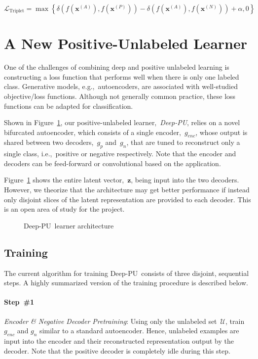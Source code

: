 \documentclass[10pt]{article}
\newcommand{\toolname}{Deep-PU}
\newcommand{\xI}[1]{\mathbf{x}^{(#1)}}
\newcommand{\puDist}[2]{\delta\left(#1, #2\right)}
\newcommand{\nnDist}[3]{\puDist{#1\left(#2\right)}{#1\left(#3\right)}}
\newcommand{\lTrip}{\mathcal{L}_{\text{Triplet}}}
\newcommand{\exA}{\xI{{A}}}
\newcommand{\exP}{\xI{{P}}}
\newcommand{\exN}{\xI{{N}}}
\begin{document}
  \begin{equation}\label{eq:TripletLoss}
    \lTrip = \max\left\{ \nnDist{f}{\exA}{\exP} - \nnDist{f}{\exA}{\exN} + \alpha, 0 \right\}
  \end{equation}

\section{A New Positive-Unlabeled Learner}\label{sec:DeepPU}

One of the challenges of combining deep and positive unlabeled learning is constructing a loss function that performs well when there is only one labeled class.  Generative models, e.g.,~autoencoders, are associated with well-studied objective/loss functions.  Although not generally common practice, these loss functions can be adapted for classification.

Shown in Figure~\ref{fig:DeepPU}, our positive-unlabeled learner,~\textit{\toolname}, relies on a novel bifurcated autoencoder, which consists of a single encoder,~$g_{enc}$, whose output is shared between two decoders,~$g_{p}$ and~$g_{n}$, that are tuned to reconstruct only a single class, i.e.,~positive or negative respectively.  Note that the encoder and decoders can be feed-forward or convolutional based on the application.

Figure~\ref{fig:DeepPU} shows the entire latent vector,~$\mathbf{z}$, being input into the two decoders.  However, we theorize that the architecture may get better performance if instead only disjoint slices of the latent representation are provided to each decoder.  This is an open area of study for the project.

\begin{figure}[t]
  \centering
  
  \caption{\toolname\ learner architecture}\label{fig:DeepPU}
\end{figure}

\subsection{Training}

The current algorithm for training \toolname\ consists of three disjoint, sequential steps.  A highly summarized version of the training procedure is described below.

\paragraph{Step~\#1} \textit{Encoder \& Negative Decoder Pretraining}: Using only the unlabeled set~$\mathcal{U}$, train $g_{enc}$ and $g_{n}$ similar to a standard autoencoder.  Hence, unlabeled examples are input into the encoder and their reconstructed representation output by the decoder.  Note that the positive decoder is completely idle during this step.
\end{document}
